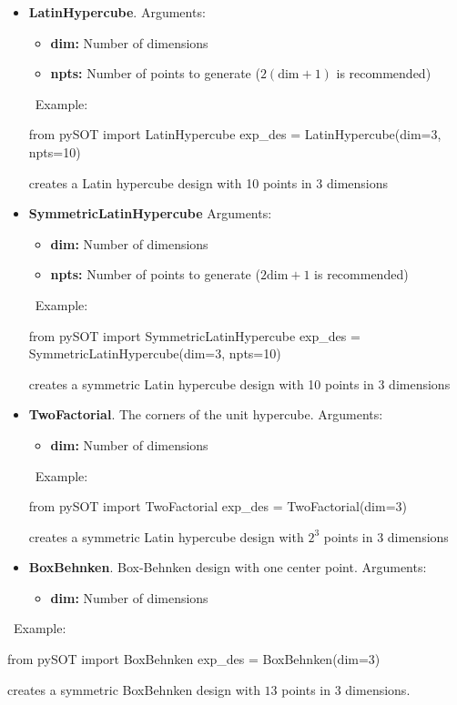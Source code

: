 \documentclass[]{article}
\begin{document}
\begin{itemize}

\item \textbf{LatinHypercube}. Arguments:
\begin{itemize}
\item \textbf{dim:} Number of dimensions
\item \textbf{npts:} Number of points to generate ($2( \text{dim}+1)$ is recommended)
\end{itemize} 
\ \newline Example: 
\begin{python}
from pySOT import LatinHypercube
exp_des = LatinHypercube(dim=3, npts=10)
\end{python}
creates a Latin hypercube design with 10 points in 3 dimensions

\item \textbf{SymmetricLatinHypercube} Arguments:
\begin{itemize}
\item \textbf{dim:} Number of dimensions
\item \textbf{npts:} Number of points to generate ($2 \text{dim}+1$ is recommended)
\end{itemize}
\ \newline Example: 
\begin{python}
from pySOT import SymmetricLatinHypercube
exp_des = SymmetricLatinHypercube(dim=3, npts=10)
\end{python}
creates a symmetric Latin hypercube design with 10 points in 3 dimensions

\item \textbf{TwoFactorial}. The corners of the unit hypercube. Arguments:
\begin{itemize}
\item \textbf{dim:} Number of dimensions
\end{itemize} 
\ \newline Example: 
\begin{python}
from pySOT import TwoFactorial
exp_des = TwoFactorial(dim=3)
\end{python}
creates a symmetric Latin hypercube design with $2^3$ points in 3 dimensions

\item \textbf{BoxBehnken}. Box-Behnken design with one center point. Arguments:
\begin{itemize}
\item \textbf{dim:} Number of dimensions
\end{itemize} 
\end{itemize}
\ \newline Example: 
\begin{python}
from pySOT import BoxBehnken
exp_des = BoxBehnken(dim=3)
\end{python}
creates a symmetric BoxBehnken design with $13$ points in 3 dimensions.
\end{document}
